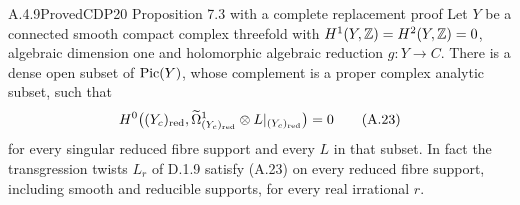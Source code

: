 
\begin{statement}{A.4.9}{Proved}{CDP20 Proposition 7.3 with a complete replacement proof}
Let $Y$ be a connected smooth compact complex threefold with $H^1(Y,\mathbb Z)=H^2(Y,\mathbb Z)=0$, algebraic dimension one and holomorphic algebraic reduction $g:Y\to C$. There is a dense open subset of $\operatorname{Pic}(Y)$, whose complement is a proper complex analytic subset, such that
\[
 H^0\bigl((Y_c)_{\rm red},
       \widetilde\Omega^1_{(Y_c)_{\rm red}}\otimes L|_{(Y_c)_{\rm red}}\bigr)=0
 \tag{A.23}
\]
for every singular reduced fibre support and every $L$ in that subset. In fact the transgression twists $L_r$ of D.1.9 satisfy (A.23) on every reduced fibre support, including smooth and reducible supports, for every real irrational $r$.
\end{statement}
